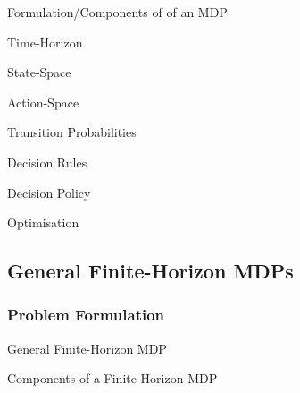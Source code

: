 \documentclass[11pt,a4paper]{article}
\begin{document}
  \begin{proposition}{Formulation/Components of of an MDP}

  \end{proposition}

  \begin{definition}{Time-Horizon}

  \end{definition}

  \begin{definition}{State-Space}

  \end{definition}

  \begin{definition}{Action-Space}

  \end{definition}

  \begin{definition}{Transition Probabilities}

  \end{definition}

  \begin{definition}{Decision Rules}

  \end{definition}

  \begin{definition}{Decision Policy}

  \end{definition}

  \begin{definition}{Optimisation}
  \end{definition}

\subsection{General Finite-Horizon MDPs} %

\subsubsection{Problem Formulation} %

  \begin{definition}{General Finite-Horizon MDP}

  \end{definition}

  \begin{proposition}{Components of a Finite-Horizon MDP}
  \end{proposition}
\end{document}
